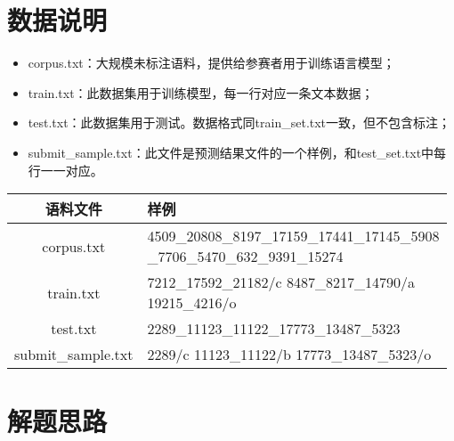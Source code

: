 \documentclass[9pt,aspectratio=169]{ctexbeamer}
\begin{document}
	\section{数据说明}
	
	\begin{frame}
		\begin{itemize}
			\item corpus.txt：大规模未标注语料，提供给参赛者用于训练语言模型；
			\item train.txt：此数据集用于训练模型，每一行对应一条文本数据；
			\item test.txt：此数据集用于测试。数据格式同train\_set.txt一致，但不包含标注；
			\item submit\_sample.txt：此文件是预测结果文件的一个样例，和test\_set.txt中每行一一对应。
		\end{itemize}
		\begin{table}[]
			\begin{tabular}{|c|l|}
				\hline
				语料文件               & 样例                                                                         \\
				\hline
				corpus.txt         & \makecell[l]{4509\_20808\_8197\_17159\_17441\_17145\_5908\\\_7706\_5470\_632\_9391\_15274} \\
				\hline
				train.txt          & \makecell[l]{7212\_17592\_21182/c  8487\_8217\_14790/a \\ 19215\_4216/o}                    \\
				\hline
				test.txt           & 2289\_11123\_11122\_17773\_13487\_5323                              \\
				\hline
				submit\_sample.txt & 2289/c 11123\_11122/b 17773\_13487\_5323/o         \\
				\hline
				                
			\end{tabular}
		\end{table}
	\end{frame}
	
	\section{解题思路}
	
\end{document}
